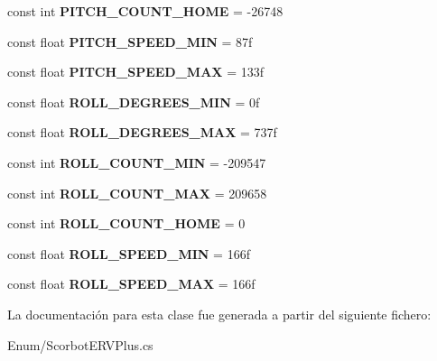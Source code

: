 \begin{DoxyCompactItemize}
const int {\bfseries P\+I\+T\+C\+H\+\_\+\+C\+O\+U\+N\+T\+\_\+\+H\+O\+ME} = -\/26748
\item 
\mbox{\label{class_scorbot_e_r_v_plus_aa6e58e313ecef3017eff2ed96d113fcf}} 
const float {\bfseries P\+I\+T\+C\+H\+\_\+\+S\+P\+E\+E\+D\+\_\+\+M\+IN} = 87f
\item 
\mbox{\label{class_scorbot_e_r_v_plus_aaf633722272caef41328d57ad9ae7f41}} 
const float {\bfseries P\+I\+T\+C\+H\+\_\+\+S\+P\+E\+E\+D\+\_\+\+M\+AX} = 133f
\item 
\mbox{\label{class_scorbot_e_r_v_plus_a7f8cb0f5ef4d1b2d898a93de44aead31}} 
const float {\bfseries R\+O\+L\+L\+\_\+\+D\+E\+G\+R\+E\+E\+S\+\_\+\+M\+IN} = 0f
\item 
\mbox{\label{class_scorbot_e_r_v_plus_a98789ef1835295706a3e3f36d02210a0}} 
const float {\bfseries R\+O\+L\+L\+\_\+\+D\+E\+G\+R\+E\+E\+S\+\_\+\+M\+AX} = 737f
\item 
\mbox{\label{class_scorbot_e_r_v_plus_a727be3e6188a55308291d7f9531cbbd4}} 
const int {\bfseries R\+O\+L\+L\+\_\+\+C\+O\+U\+N\+T\+\_\+\+M\+IN} = -\/209547
\item 
\mbox{\label{class_scorbot_e_r_v_plus_a6b4dccd567267712c12fde6fc8cc06b6}} 
const int {\bfseries R\+O\+L\+L\+\_\+\+C\+O\+U\+N\+T\+\_\+\+M\+AX} = 209658
\item 
\mbox{\label{class_scorbot_e_r_v_plus_a913690cd60c5fd21a1fe275a54743fae}} 
const int {\bfseries R\+O\+L\+L\+\_\+\+C\+O\+U\+N\+T\+\_\+\+H\+O\+ME} = 0
\item 
\mbox{\label{class_scorbot_e_r_v_plus_a4b1c28f7c0e51649f763b8a2cf6167dd}} 
const float {\bfseries R\+O\+L\+L\+\_\+\+S\+P\+E\+E\+D\+\_\+\+M\+IN} = 166f
\item 
\mbox{\label{class_scorbot_e_r_v_plus_a3f13b313829c31207c13a8111e20c851}} 
const float {\bfseries R\+O\+L\+L\+\_\+\+S\+P\+E\+E\+D\+\_\+\+M\+AX} = 166f
\end{DoxyCompactItemize}


La documentación para esta clase fue generada a partir del siguiente fichero\+:\begin{DoxyCompactItemize}
\item 
Enum/Scorbot\+E\+R\+V\+Plus.\+cs\end{DoxyCompactItemize}

